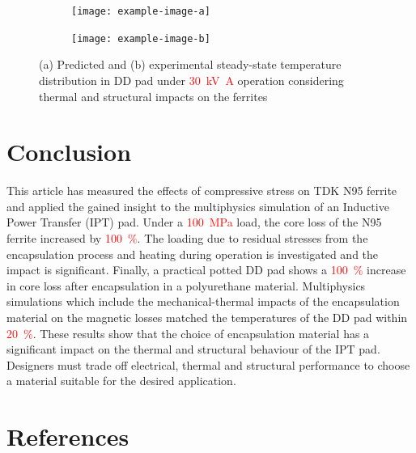 \documentclass[conference]{IEEEtran}
\begin{document}
\begin{figure}[t]
  \centering
  \begin{subfigure}{\columnwidth}
    \centering
    \texttt{[image: example-image-a]}
    \caption{}
  \end{subfigure}
  \vspace{1em}

  \begin{subfigure}{\columnwidth}
    \centering
    \texttt{[image: example-image-b]}
    \caption{}
  \end{subfigure}
  \caption{(a) Predicted and (b) experimental steady-state temperature distribution in DD pad under \textcolor{red}{\SI{30}{\kilo\volt\ampere}} operation considering thermal and structural impacts on the ferrites}
  \label{fig:temperaturecomparison}
\end{figure}

\section{Conclusion}
\label{sec:conclusion}

This article has measured the effects of compressive stress on TDK N95 ferrite and applied the gained insight to the multiphysics simulation of an Inductive Power Transfer (IPT) pad. 
Under a \textcolor{red}{\SI{100}{\mega\pascal}} load, the core loss of the N95 ferrite increased by \textcolor{red}{\SI{100}{\percent}}. 
The loading due to residual stresses from the encapsulation process and heating during operation is investigated and the impact is significant. 
Finally, a practical potted DD pad shows a \textcolor{red}{\SI{100}{\percent}} increase in core loss after encapsulation in a polyurethane material. 
Multiphysics simulations which include the mechanical-thermal impacts of the encapsulation material on the magnetic losses matched the temperatures of the DD pad within \textcolor{red}{\SI{20}{\percent}}. 
These results show that the choice of encapsulation material has a significant impact on the thermal and structural behaviour of the IPT pad. 
Designers must trade off electrical, thermal and structural performance to choose a material suitable for the desired application.

\section*{References}

\printbibliography[heading=none]
\end{document}
